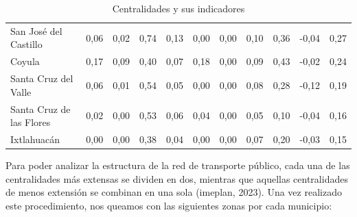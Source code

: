 \documentclass[openany]{book}
\begin{document}
\begin{table}[H]
\begin{tabular}{|l|c|c|c|c|c|c|c|c|c|c|}
			San José del Castillo & 0,06 & 0,02 & 0,74 & 0,13 & 0,00 & 0,00 & 0,10 & 0,36 & -0,04 & 0,27 \\
			Coyula & 0,17 & 0,09 & 0,40 & 0,07 & 0,18 & 0,00 & 0,09 & 0,43 & -0,02 & 0,24 \\
			Santa Cruz del Valle & 0,06 & 0,01 & 0,54 & 0,05 & 0,00 & 0,00 & 0,08 & 0,28 & -0,12 & 0,19 \\
			Santa Cruz de las Flores & 0,02 & 0,00 & 0,53 & 0,06 & 0,04 & 0,00 & 0,05 & 0,10 & -0,04 & 0,16 \\
			Ixtlahuacán & 0,00 & 0,00 & 0,38 & 0,04 & 0,00 & 0,00 & 0,07 & 0,20 & -0,03 & 0,15 \\
			\hline
			\end{tabular}
			\caption{Centralidades y sus indicadores}
			\label{tab:centralidades}
			\end{table}

            Para poder analizar la estructura de la red de transporte público, cada una de las centralidades más extensas se dividen en dos, mientras que aquellas centralidades de menos extensión se combinan en una sola (imeplan, 2023). Una vez realizado este procedimiento, nos queamos con las siguientes zonas por cada municipio:
\end{document}
